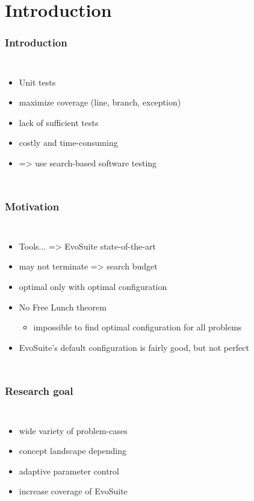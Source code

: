 \section{Introduction} 

\begin{frame}
	\frametitle{Introduction}
	
	\begin{columns}[c]
		
		\column{\textwidth}
		\begin{itemize}
			\item Unit tests
			\item maximize coverage (line, branch, exception)
			\item lack of sufficient tests
			\item costly and time-consuming
			\item => use search-based software testing
		\end{itemize}
		
	\end{columns}
	
\end{frame}

\begin{frame}
	\frametitle{Motivation}
	
	\begin{columns}[c]
		
		\column{\textwidth}
		\begin{itemize}
			\item Tools... => EvoSuite state-of-the-art
			\item may not terminate => search budget
			\item optimal only with optimal configuration
			\item No Free Lunch theorem 
				\begin{itemize}
					\item impossible to find optimal configuration for all problems
				\end{itemize}
			\item EvoSuite's default configuration is fairly good, but not perfect
		\end{itemize}
		
	\end{columns}
	
\end{frame}

\begin{frame}
	\frametitle{Research goal}
	
	\begin{columns}[c]
		
		\column{\textwidth}
		\begin{itemize}
			\item wide variety of problem-cases
			\item concept landscape depending 
			\item adaptive parameter control
			\item increase coverage of EvoSuite
		\end{itemize}
		
	\end{columns}
	
\end{frame}

